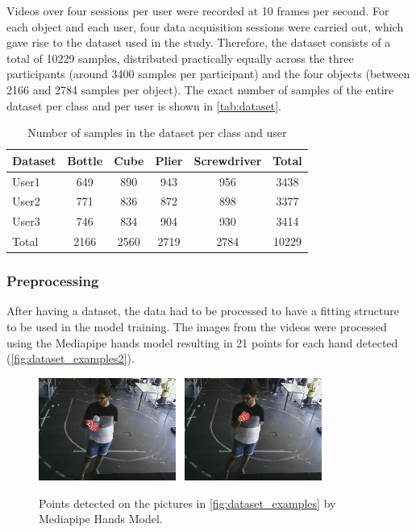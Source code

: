 Videos over four sessions per user were recorded at 10 frames per second. For each object and each user, four data acquisition sessions were carried out, which gave rise to the dataset used in the study. Therefore, the dataset consists of a total of \num{10229} samples, distributed practically equally across the three participants (around \num{3400} samples per participant) and the four objects (between \num{2166} and \num{2784} samples per object). The exact number of samples of the entire dataset per class and per user is shown in \autoref{tab:dataset}.

\begin{table}[ht] 
\centering
\caption{Number of samples in the dataset per class and user}
\label{tab:dataset}
\begin{tabular}{lccccc}
\toprule
Dataset & Bottle & Cube & Plier & Screwdriver & Total \\
\midrule
User1 & \num{649} & \num{890} & \num{943} & \num{956} & \num{3438}\\
User2 & \num{771} & \num{836} & \num{872} & \num{898} & \num{3377}\\
User3 & \num{746} & \num{834} & \num{904} & \num{930} & \num{3414}\\
\midrule
Total & \num{2166} & \num{2560} & \num{2719} & \num{2784} & \num{10229}\\
\bottomrule
\end{tabular}
\end{table}

\subsubsection{Preprocessing}

After having a dataset, the data had to be processed to have a fitting structure to be used in the model training. The images from the videos were processed using the Mediapipe hands model resulting in 21 points for each hand detected (\autoref{fig:dataset_examples2}).

\begin{figure}[ht]
    \centerline{\includegraphics[width=0.4\textwidth]{figs/dataset_preprocessing2_1.png} \ \includegraphics[width=0.4\textwidth]{figs/dataset_preprocessing2_2.png}}
    \caption{Points detected on the pictures in \autoref{fig:dataset_examples} by Mediapipe Hands Model.}
    \label{fig:dataset_examples2}
\end{figure}

